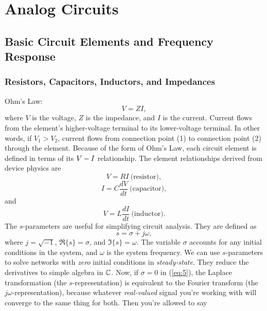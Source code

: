 \chapter{Analog Circuits} \hr
\section{Basic Circuit Elements and Frequency Response}
\subsection{Resistors, Capacitors, Inductors, and Impedances}
Ohm's Law:
\begin{equation}
\label{eq:1}
V = Z I,
\end{equation}
where $V$ is the voltage, $Z$ is the impedance, and $I$ is the current. Current flows from the element's higher-voltage terminal to its lower-voltage terminal. In other words, if $V_{1} > V_{2}$, current flows from connection point (1) to connection point (2) through the element.
Because of the form of Ohm's Law, each circuit element is defined in terms of its $V \-- I$ relationship. The element relationships derived from device physics are
\begin{equation}
\label{eq:2}
V = R I ~\text{(resistor)},
\end{equation}
\begin{equation}
\label{eq:3}
I = C \frac{dV}{dt} ~\text{(capacitor)},
\end{equation}
and
\begin{equation}
\label{eq:4}
V = L \frac{dI}{dt} ~\text{(inductor)}.
\end{equation}
The $s$-parameters are useful for simplifying circuit analysis. They are defined as
\begin{equation}
\label{eq:5}
s = \sigma + j \omega,
\end{equation}
where $j = \sqrt{-1}$, $\Re\{ s \} = \sigma$, and $\Im\{ s \} = \omega$. The variable $\sigma$ accounts for any initial conditions in the system, and $\omega$ is the system frequency. We can use $s$-parameters to solve networks with \textit{zero} initial conditions in \textit{steady-state}. They reduce the derivatives to simple algebra in $\mathbb{C}$. Now, if $\sigma = 0$ in (\ref{eq:5}), the Laplace transformation (the $s$-representation) is equivalent to the Fourier transform (the $j \omega$-representation), because whatever \textit{real-valued} signal you're working with will converge to the same thing for both. Then you're allowed to say
